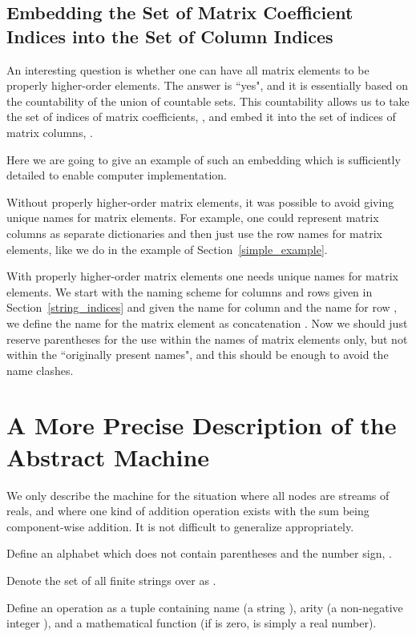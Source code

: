 \documentclass[withtimes]{easychair}
\begin{document}
\subsection{Embedding the Set of Matrix Coefficient Indices into the Set of Column Indices}\label{countable_embedding} 

An interesting question is whether one can have all matrix elements to be properly higher-order elements.
The answer is ``yes", and it is essentially based on the countability of the union of countable sets.
This countability allows us to take the set of indices of matrix coefficients, , and embed it into the set
of indices of matrix columns, .

Here we are going to give an example of such an embedding which is sufficiently detailed to enable computer
implementation.

Without properly higher-order matrix elements, it was possible to avoid giving unique names for matrix elements.
For example, one could represent matrix columns as separate dictionaries and then just use the row names
for matrix elements, like we do in the example of Section~\ref{simple_example}.

With properly higher-order matrix elements one needs unique names for matrix elements. We start with
the naming scheme for columns and rows given in Section~\ref{string_indices} and given the name  for
column  and the name  for row , we define the name for the matrix element  as concatenation
. Now we should just reserve parentheses for the use within the names of matrix elements
only, but not within the ``originally present names", and this should be enough to avoid the name clashes.

\section{A More Precise Description of the Abstract Machine}\label{abstract_machine}

We only describe the machine for the situation where all nodes are streams of reals, and where one kind
of addition operation exists with the sum being component-wise addition. It is not difficult to generalize
appropriately.

Define an alphabet  which does not contain parentheses and the number sign, .

Denote the set of all finite strings over  as .

Define an operation as a tuple  containing name (a string ), arity (a non-negative integer ), and
a mathematical function  (if  is zero,  is simply a real number).
\end{document}
